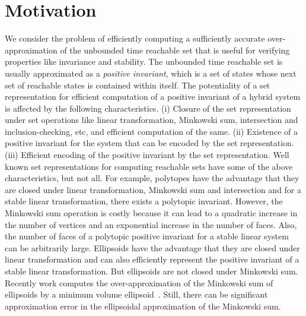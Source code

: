 \documentclass[11pt,a4paper,twoside,openright]{article}
\begin{document}
\section{Motivation}
We consider the problem of efficiently computing a sufficiently
accurate over-approximation of the unbounded time reachable set that
is useful for verifying properties like invariance and stability.  The
unbounded time reachable set is usually approximated as a {\it
  positive invariant}, which is a set of states whose next set of
reachable states is contained within itself.  The potentiality of a
set representation for efficient computation of a positive invariant
of a hybrid system is affected by the following characteristics.  (i)
Closure of the set representation under set operations like linear
transformation, Minkowski sum, intersection and inclusion-checking,
etc, and efficient computation of the same.  (ii) Existence of a
positive invariant for the system that can be encoded by the set
representation. (iii) Efficient encoding of the positive invariant by
the set representation.  Well known set representations for computing
reachable sets have some of the above characteristics, but not all.
For example, polytopes have the advantage that they are closed under
linear transformation, Minkowski sum and intersection and for a stable
linear transformation, there exists a polytopic invariant.  However,
the Minkowski sum operation is costly because it can lead to a
quadratic increase in the number of vertices and an exponential
increase in the number of faces.  Also, the number of faces of a
polytopic positive invariant for a stable linear system can be
arbitrarily large.  Ellipsoids have the advantage that they are closed
under linear transformation and can also efficiently represent the
positive invariant of a stable linear transformation.  But ellipsoids
are not closed under Minkowski sum.  Recently work computes the
over-approximation of the Minkowski sum of ellipsoids by a minimum
volume ellipsoid~\cite{allamigeon2017fast}.  Still, there can be significant
approximation error in the ellipsoidal approximation of the Minkowski
sum.
\end{document}

